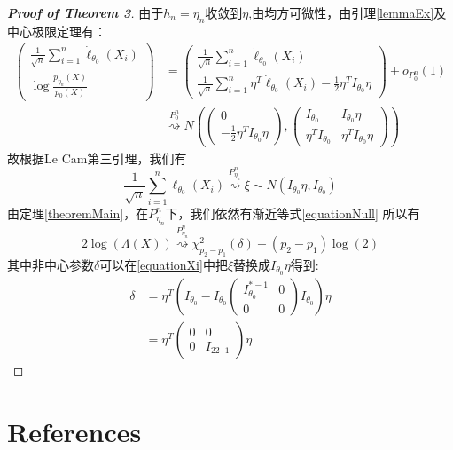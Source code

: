 \documentclass[review]{elsarticle}
\begin{document}
\begin{proof}[\textbf{Proof of Theorem 3}]
    由于$h_n=\eta_n$收敛到$\eta$,由均方可微性，由引理\ref{lemmaEx}及中心极限定理有：
\begin{equation}
    \begin{aligned}
    \left(
    \begin{matrix}
        \frac{1}{\sqrt{n}}\sum^n_{i=1}\dot{\ell}_{\theta_0}(X_i)
        \\
        \log \frac{p_{\eta_n}(X)}{p_0(X)}
    \end{matrix}
    \right)
    &=\left(
        \begin{matrix}
        \frac{1}{\sqrt{n}}\sum^n_{i=1}\dot{\ell}_{\theta_0}(X_i)
        \\
        \frac{1}{\sqrt{n}}\sum^n_{i=1}\eta^T\dot{\ell}_{\theta_0}(X_i)-\frac{1}{2}\eta^TI_{\theta_0}\eta
        \end{matrix}
    \right)
    +o_{P_0^n}(1)\\
    &\overset{P_0^n}{\rightsquigarrow}
    N(
    \left(
    \begin{matrix}
        0\\
        -\frac{1}{2}\eta^TI_{\theta_0}\eta
    \end{matrix}
    \right),
    \left(
        \begin{matrix}
            I_{\theta_0}&I_{\theta_0}\eta\\
            \eta^TI_{\theta_0}&\eta^TI_{\theta_0}\eta
        \end{matrix}
    \right)
    )
    \end{aligned}
\end{equation}
故根据Le Cam第三引理，我们有
\begin{equation}
    \frac{1}{\sqrt{n}}\sum^n_{i=1}\dot{\ell}_{\theta_0}(X_i)\overset{P^n_{\eta_n}}{\rightsquigarrow}\xi\sim N(I_{\theta_0}\eta,I_{\theta_0})
\end{equation}
由定理\ref{theoremMain}，在$P_{\eta_n}^n$下，我们依然有渐近等式\eqref{equationNull}
所以有
\begin{equation}
    2\log(\Lambda(X))\overset{P_{\eta_n}^n}{\rightsquigarrow} \chi^2_{p_2-p_1}(\delta)-(p_2-p_1)\log(2)
\end{equation}
其中非中心参数$\delta$可以在\eqref{equationXi}中把$\xi$替换成$I_{\theta_0}\eta$得到:
\begin{equation}
    \begin{aligned}
        \delta&=\eta^T(
        I_{\theta_0}-
        I_{\theta_0}
        \left(\begin{matrix} 
                I^{*-1}_{\theta_0}&0\\
                0&0
        \end{matrix}\right)
        I_{\theta_0}
    )\eta
    \\
    &=\eta^T
    \left(
        \begin{matrix}
            0&0\\
            0&I_{22\cdot 1}
        \end{matrix}
    \right)
    \eta
    \end{aligned}
\end{equation}
\end{proof}



\section*{References}


\end{document}
